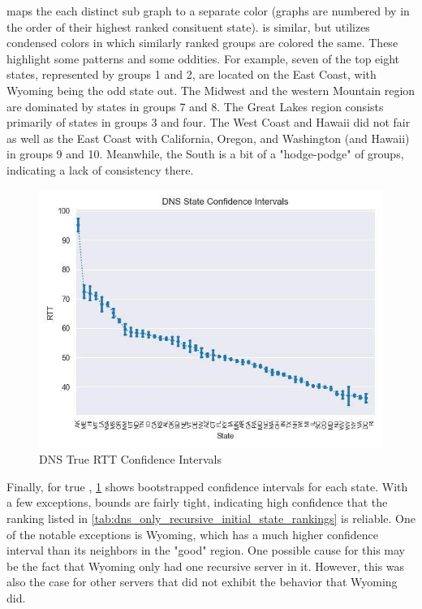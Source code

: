  maps the each distinct sub graph to a separate color (graphs are numbered by in the order of their highest ranked consituent state).  is similar, but utilizes condensed colors in which similarly ranked groups are colored the same. These highlight some patterns and some oddities. For example, seven of the top eight states, represented by groups 1 and 2, are located on the East Coast, with Wyoming being the odd state out. The Midwest and the western Mountain region are dominated by states in groups 7 and 8. The Great Lakes region consists primarily of states in groups 3 and four. The West Coast and Hawaii did not fair as well as the East Coast with California, Oregon, and Washington (and Hawaii) in groups 9 and 10. Meanwhile, the South is a bit of a "hodge-podge" of groups, indicating a lack of consistency there.


\begin{figure}[H]
    \centering
    \includegraphics{images/dns/analysis_no_auth_agg/rtt/no_auth_agg_rtt_confidence.jpg}
    \caption{DNS True RTT Confidence Intervals}
    \label{fig:dns_true_rtt_confidence_intervals}
\end{figure}

Finally, for true \rtt, \cref{fig:dns_true_rtt_confidence_intervals} shows bootstrapped confidence intervals for each state. With a few exceptions, bounds are fairly tight, indicating high confidence that the ranking listed in \cref{tab:dns_only_recursive_initial_state_rankings} is reliable. One of the notable exceptions is Wyoming, which has a much higher confidence interval than its neighbors in the "good" \rtt region. One possible cause for this may be the fact that Wyoming only had one recursive server in it. However, this was also the case for other servers that did not exhibit the behavior that Wyoming did.

